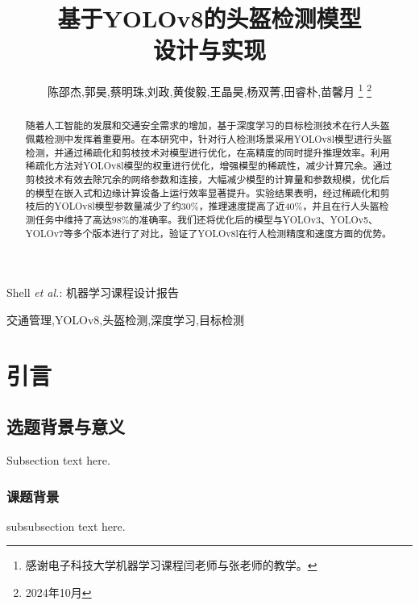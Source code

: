 \documentclass[journal]{IEEEtran}
\begin{document}
\title{基于YOLOv8的头盔检测模型\\设计与实现}

\author{陈邵杰,郭昊,蔡明珠,刘政,黄俊毅,王晶昊,杨双菁,田睿朴,苗馨月%
\thanks{感谢电子科技大学机器学习课程闫老师与张老师的教学。}%
\thanks{2024年10月}}


%
{Shell \MakeLowercase{\textit{et al.}}: 机器学习课程设计报告}


\maketitle

\begin{abstract}
随着人工智能的发展和交通安全需求的增加，基于深度学习的目标检测技术在行人头盔佩戴检测中发挥着重要用。在本研究中，针对行人检测场景采用YOLOv8l模型进行头盔检测，并通过稀疏化和剪枝技术对模型进行优化，在高精度的同时提升推理效率。利用稀疏化方法对YOLOv8l模型的权重进行优化，增强模型的稀疏性，减少计算冗余。通过剪枝技术有效去除冗余的网络参数和连接，大幅减少模型的计算量和参数规模，优化后的模型在嵌入式和边缘计算设备上运行效率显著提升。实验结果表明，经过稀疏化和剪枝后的YOLOv8l模型参数量减少了约30\%，推理速度提高了近40\%，并且在行人头盔检测任务中维持了高达98\%的准确率。我们还将优化后的模型与YOLOv3、YOLOv5、YOLOv7等多个版本进行了对比，验证了YOLOv8l在行人检测精度和速度方面的优势。
\end{abstract}

\begin{IEEEkeywords}
交通管理,YOLOv8,头盔检测,深度学习,目标检测
\end{IEEEkeywords}

\IEEEpeerreviewmaketitle

\section{引言}

\subsection{选题背景与意义}
Subsection text here.
\subsubsection{课题背景}
subsubsection text here.
\end{document}
